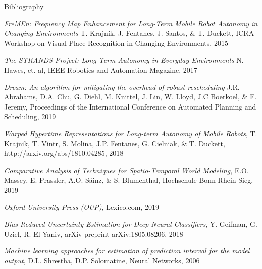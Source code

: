 \documentclass{beamer}
\begin{document}
\begin{frame}[allowframebreaks]{Bibliography}
  \begin{thebibliography}{8}
      \emph{FreMEn: Frequency Map Enhancement for Long-Term Mobile Robot Autonomy in Changing Environments}
      T. Krajník, J. Fentanes, J. Santos, \& T. Duckett,
      ICRA Workshop on Visual Place Recognition in Changing Environments,
      2015

      \emph{The STRANDS Project: Long-Term Autonomy in Everyday Environments}
      N. Hawes, et. al,
      IEEE Robotics and Automation Magazine,
      2017

      \emph{Dream:  An algorithm for mitigating the overhead of robust rescheduling}
      J.R. Abrahams, D.A. Chu, G. Diehl, M. Knittel, J. Lin, W. Lloyd, J.C Boerkoel, \& F. Jeremy,
      Proceedings of the International Conference on Automated Planning and Scheduling,
      2019

      \emph{Warped Hypertime Representations for Long-term Autonomy of Mobile Robots},
      T. Krajnik, T. Vintr, S. Molina, J.P. Fentanes, G. Cielniak, \& T. Duckett,
      http://arxiv.org/abs/1810.04285,
      2018

      \emph{Comparative Analysis of Techniques for Spatio-Temporal World Modeling},
      E.O. Massey, E. Prassler, A.O. S{\'{a}}inz, \& S. Blumenthal,
      Hochschule Bonn-Rhein-Sieg,
      2019

      \emph{Oxford University Press (OUP)},
      Lexico.com,
      2019

      \emph{Bias-Reduced Uncertainty Estimation for Deep Neural Classifiers},
      Y. Geifman, G. Uziel, R. El-Yaniv,
      arXiv preprint arXiv:1805.08206,
      2018

      \emph{Machine learning approaches for estimation of prediction interval for the model output},
      D.L. Shrestha, D.P. Solomatine,
      Neural Networks,
      2006

  \end{thebibliography}
\end{frame}
\end{document}
